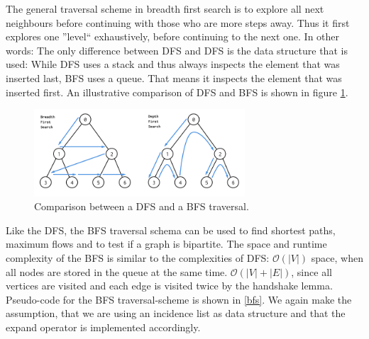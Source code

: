         The general traversal scheme in breadth first search is to explore all next neighbours before continuing with those who are more steps away. 
        Thus it first explores one ''level`` exhaustively, before continuing to the next one. 
        In other words: The only difference between DFS and DFS is the data structure that is used: While DFS uses a stack and thus always inspects the element that was inserted last, BFS uses a queue.
        That means it inspects the element that was inserted first.
        An illustrative comparison of DFS and BFS is shown in figure \ref{dfs-bfs}. \\
        
        \begin{figure}
         \begin{center}
          \includegraphics[keepaspectratio,width=0.7\textwidth, height=0.3\textheight]{img/bfs-dfs.png}
         \end{center}
          \caption{Comparison between a DFS and a BFS traversal.}\label{dfs-bfs}
        \end{figure}
        
        Like the DFS, the BFS traversal schema can be used to find shortest paths, maximum flows and to test if a graph is bipartite. 
        The space and runtime complexity of the BFS is similar to the complexities of DFS: $\mathcal{O}(|V|)$ space, when all nodes are stored in the queue at the same time. 
        $\mathcal{O}(|V| + |E|)$, since all vertices are visited and each edge is visited twice by the handshake lemma. 
        Pseudo-code for the BFS traversal-scheme is shown in \ref{bfs}. 
        We again make the assumption, that we are using an incidence list as data structure and that the expand operator is implemented accordingly.

